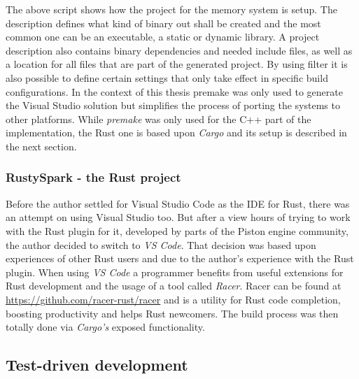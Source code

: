 \noindent
The above script shows how the project for the memory system is setup. The description defines what kind of binary out shall be created and the most common one can be an executable, a static or dynamic library. A project description also contains binary dependencies and needed include files, as well as a location for all files that are part of the generated project. By using filter it is also possible to define certain settings that only take effect in specific build configurations. In the context of this thesis premake was only used to generate the Visual Studio solution but simplifies the process of porting the systems to other platforms. While \textit{premake} was only used for the C++ part of the implementation, the Rust one is based upon \textit{Cargo} and its setup is described in the next section.

\subsubsection{RustySpark - the Rust project}

Before the author settled for Visual Studio Code as the \ac{IDE} for Rust, there was an attempt on using Visual Studio too. But after a view hours of trying to work with the Rust plugin for it, developed by parts of the Piston engine community, the author decided to switch to \textit{VS Code}. That decision was based upon experiences of other Rust users and due to the author's experience with the Rust plugin. When using \textit{VS Code} a programmer benefits from useful extensions for Rust development and the usage of a tool called \textit{Racer}. Racer can be found at \url{https://github.com/racer-rust/racer} and is a utility for Rust code completion, boosting productivity and helps Rust newcomers. The build process was then totally done via \textit{Cargo's} exposed functionality. 

\subsection{Test-driven development} \label{tdd}

